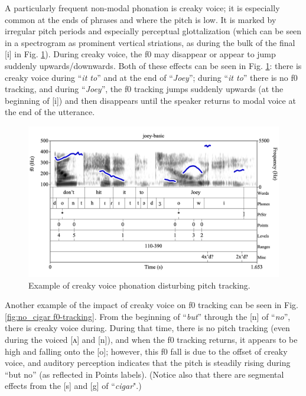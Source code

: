 \documentclass[11pt, twoside]{memoir}
\def\langtext#1{\textit{#1}}
\begin{document}
A particularly frequent non-modal phonation is creaky voice; it is especially common at the ends of phrases and where the pitch is low. It is marked by irregular pitch periods and especially perceptual glottalization (which can be seen in a spectrogram as prominent vertical striations, as during the bulk of the final [i] in Fig. \ref{fig:joey f0-tracking}). During creaky voice, the f0 may disappear or appear to jump suddenly upwards\slash downwards. Both of these effects can be seen in Fig. \ref{fig:joey f0-tracking}: there is creaky voice during “\langtext{it to}” and at the end of “\langtext{Joey}”; during “\langtext{it to}” there is no f0 tracking, and during “\langtext{Joey}”, the f0 tracking jumps suddenly upwards (at the beginning of [i]) and then disappears until the speaker returns to modal voice at the end of the utterance.

\begin{figure}[H]
\centering
%
\includegraphics[width=.875\linewidth]{Appendix-joey.png}
%
\caption{Example of creaky voice phonation disturbing pitch tracking.%
\label{fig:joey f0-tracking}%
%
}
\end{figure}

Another example of the impact of creaky voice on f0 tracking can be seen in Fig. \ref{fig:no_cigar f0-tracking}. From the beginning of “\langtext{but}” through the [n] of “\langtext{no}”, there is creaky voice during. During that time, there is no pitch tracking (even during the voiced [ʌ] and [n]), and when the f0 tracking returns, it appears to be high and falling onto the [o]; however, this f0 fall is due to the offset of creaky voice, and auditory perception indicates  that the pitch is steadily rising during “but no” (as reflected in Points labels). (Notice also that there are segmental effects from the [s] and [g] of “\langtext{cigar}".)
\end{document}
